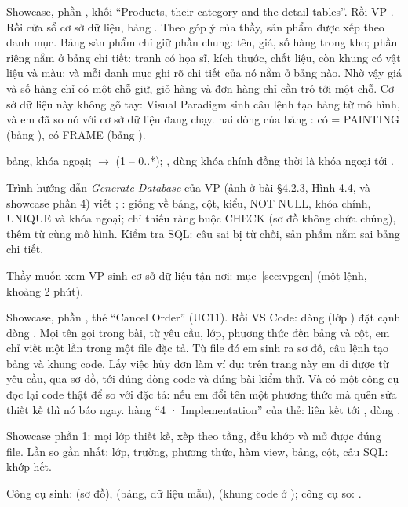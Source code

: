 {Showcase, phần , khối ``Products, their category and the detail tables''. Rồi VP . Rồi cửa sổ cơ sở dữ liệu, bảng .}
{Theo góp ý của thầy, sản phẩm được xếp theo danh mục. Bảng sản phẩm chỉ giữ phần chung: tên, giá, số hàng trong kho; phần riêng nằm ở bảng chi tiết: tranh có họa sĩ, kích thước, chất liệu, còn khung có vật liệu và màu; và mỗi danh mục ghi rõ chi tiết của nó nằm ở bảng nào. Nhờ vậy giá và số hàng chỉ có một chỗ giữ, giỏ hàng và đơn hàng chỉ cần trỏ tới một chỗ. Cơ sở dữ liệu này không gõ tay: Visual Paradigm sinh câu lệnh tạo bảng từ mô hình, và em đã so nó với cơ sở dữ liệu đang chạy.}
{hai dòng của bảng :  có  = PAINTING (bảng ),  có FRAME (bảng ).}
{\item \factTables{} bảng, \factFKs{} khóa ngoại;  $\to$  (1 -- 0..*); ,  dùng khóa chính đồng thời là khóa ngoại tới .
 \item Trình hướng dẫn \emph{Generate Database} của VP (ảnh ở bài §4.2.3, Hình 4.4, và showcase phần 4) viết ; : giống về bảng, \factCmpColumns{} cột, kiểu, NOT NULL, khóa chính, UNIQUE và \factCmpFKs{} khóa ngoại; chỉ thiếu \factSchemaChecks{} ràng buộc CHECK (sơ đồ không chứa chúng),  thêm từ cùng mô hình. Kiểm tra SQL: \factSqlRejected{} câu sai bị từ chối, \factMisplaced{} sản phẩm nằm sai bảng chi tiết.
 \item Thầy muốn xem VP sinh cơ sở dữ liệu tận nơi: mục~\ref{sec:vpgen} (một lệnh, khoảng 2 phút).}

{Showcase, phần , thẻ ``Cancel Order'' (UC11). Rồi VS Code:  dòng \dongModelOrder{} (lớp ) đặt cạnh  dòng \dongOrderCancel.}
{Mọi tên gọi trong bài, từ yêu cầu, lớp, phương thức đến bảng và cột, em chỉ viết một lần trong một file đặc tả. Từ file đó em sinh ra sơ đồ, câu lệnh tạo bảng và khung code. Lấy việc hủy đơn làm ví dụ: trên trang này em đi được từ yêu cầu, qua sơ đồ, tới đúng dòng code và đúng bài kiểm thử. Và có một công cụ đọc lại code thật để so với đặc tả: nếu em đổi tên một phương thức mà quên sửa thiết kế thì nó báo ngay.}
{hàng ``4 · Implementation'' của thẻ: liên kết  tới , dòng \dongOrderCancel.}
{\item Showcase phần 1: mọi lớp thiết kế, xếp theo tầng, đều khớp và mở được đúng file. Lần so gần nhất: \factCheckClasses{} lớp, \factCheckFields{} trường, \factCheckOps{} phương thức, \factCheckViews{} hàm view, \factCheckTables{} bảng, \factCheckColumns{} cột, \factCheckSql{} câu SQL: khớp hết.
 \item Công cụ sinh:  (sơ đồ),  (bảng, dữ liệu mẫu),  (khung code ở ); công cụ so: .}

